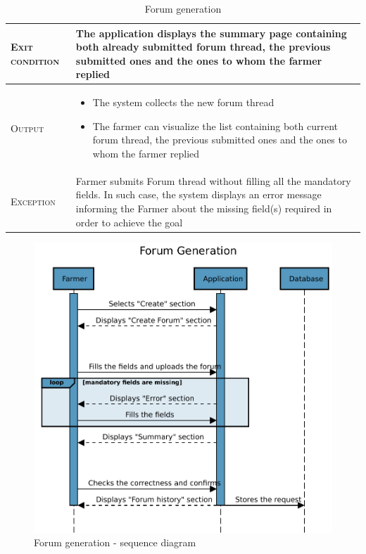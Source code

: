 \begin{table}[H]
\begin{tabular}{|l|m{}|}
        \textsc{Exit condition}    &  The application displays the summary page containing both already submitted forum thread, the previous submitted ones and the ones to whom the farmer replied\\
    	\hline %
    	\textsc{Output}             &  \begin{itemize}
    	    \item The system collects the new forum thread
    	    \item The farmer can visualize the list containing both current forum thread, the previous submitted ones and the ones to whom the farmer replied
    	\end{itemize}\\
    	\hline %
    	\textsc{Exception}         &   Farmer submits Forum thread without filling all the mandatory fields. In such case, the system displays an error message informing the Farmer about the missing field(s) required in order to achieve the goal\\
    	\hline %
        
    \end{tabular}


    \caption{\label{tab:Forum_generation}Forum generation}
\end{table}

\begin{figure}[H]
	\centering
    \includegraphics[page=1, width=\textwidth]{Images/SeqDiag/forum_generation_seq_diag.pdf}
	\caption{\label{fig:forum_generation_seq_diag}Forum generation - sequence diagram}
\end{figure}

